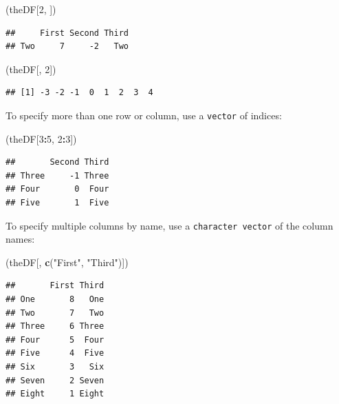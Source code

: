 \documentclass[]{book}
\newenvironment{Shaded}{\begin{snugshade}}{\end{snugshade}}
\newcommand{\DecValTok}[1]{\textcolor[rgb]{0.00,0.00,0.81}{#1}}
\newcommand{\KeywordTok}[1]{\textcolor[rgb]{0.13,0.29,0.53}{\textbf{#1}}}
\newcommand{\NormalTok}[1]{#1}
\newcommand{\OperatorTok}[1]{\textcolor[rgb]{0.81,0.36,0.00}{\textbf{#1}}}
\newcommand{\StringTok}[1]{\textcolor[rgb]{0.31,0.60,0.02}{#1}}
\theoremstyle{definition}
\theoremstyle{definition}
\theoremstyle{definition}
\theoremstyle{remark}
\begin{document}
\begin{Shaded}
\begin{Highlighting}[]
\NormalTok{(theDF[}\DecValTok{2}\NormalTok{, ])}
\end{Highlighting}
\end{Shaded}

\begin{verbatim}
##     First Second Third
## Two     7     -2   Two
\end{verbatim}

\begin{Shaded}
\begin{Highlighting}[]
\NormalTok{(theDF[, }\DecValTok{2}\NormalTok{])}
\end{Highlighting}
\end{Shaded}

\begin{verbatim}
## [1] -3 -2 -1  0  1  2  3  4
\end{verbatim}

To specify more than one row or column, use a \texttt{vector} of
indices:

\begin{Shaded}
\begin{Highlighting}[]
\NormalTok{(theDF[}\DecValTok{3}\OperatorTok{:}\DecValTok{5}\NormalTok{, }\DecValTok{2}\OperatorTok{:}\DecValTok{3}\NormalTok{])}
\end{Highlighting}
\end{Shaded}

\begin{verbatim}
##       Second Third
## Three     -1 Three
## Four       0  Four
## Five       1  Five
\end{verbatim}

To specify multiple columns by name, use a \texttt{character\ vector} of
the column names:

\begin{Shaded}
\begin{Highlighting}[]
\NormalTok{(theDF[, }\KeywordTok{c}\NormalTok{(}\StringTok{"First"}\NormalTok{, }\StringTok{"Third"}\NormalTok{)])}
\end{Highlighting}
\end{Shaded}

\begin{verbatim}
##       First Third
## One       8   One
## Two       7   Two
## Three     6 Three
## Four      5  Four
## Five      4  Five
## Six       3   Six
## Seven     2 Seven
## Eight     1 Eight
\end{verbatim}
\end{document}
